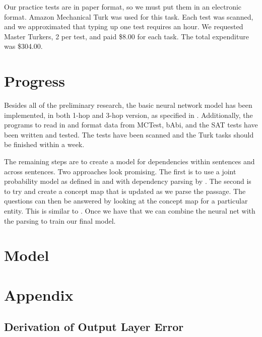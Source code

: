\documentclass[pageno]{jpaper}
\begin{document}
Our practice tests are in paper format, so we must put them in an electronic
format. Amazon Mechanical Turk was used for this task. Each test was scanned,
and we approximated that typing up one test requires an hour. We requested
Master Turkers, 2 per test, and paid \$8.00 for each task. The total expenditure
was \$304.00.

\section{Progress} Besides all of the preliminary research, the basic neural
network model has been implemented, in both 1-hop and 3-hop version, as
specified in \cite{Sukhbaatar2015}. Additionally, the programs to read in and
format data from MCTest, bAbi, and the SAT tests have been written and tested.
The tests have been scanned and the Turk tasks should be finished within a week.

The remaining steps are to create a model for dependencies within sentences and
across sentences. Two approaches look promising. The first is to use a joint
probability model as defined in \cite{Narasimhan2015} and with dependency
parsing by \cite{Chen2014}. The second is to try and create a concept map that
is updated as we parse the passage. The questions can then be answered by
looking at the concept map for a particular entity. This is similar to
\cite{Bordes2015}. Once we have that we can combine the neural net with the
parsing to train our final model.

\section{Model}
\label{Model}




\section{Appendix}
\label{Appendix}

\subsection{Derivation of Output Layer Error}
\label{Derivation of Output Layer Error}

\end{document}
